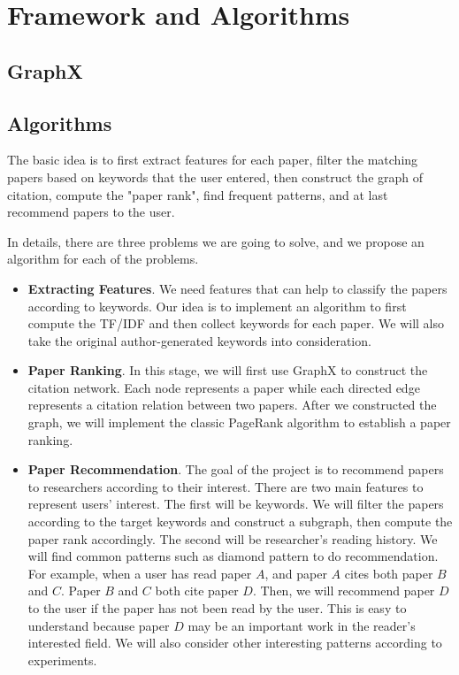 \section{Framework and Algorithms}

\subsection{GraphX}

\subsection{Algorithms}

The basic idea is to first extract features for each paper, filter the matching papers based on keywords that the user entered, then construct the graph of citation, compute the "paper rank", find frequent patterns, and at last recommend papers to the user.

In details, there are three problems we are going to solve, and we propose an algorithm for each of the problems.

\begin{itemize}
	\item \textbf{Extracting Features}. We need features that can help to classify the papers according to keywords. Our idea is to implement an algorithm to first compute the TF/IDF and then collect keywords for each paper. We will also take the original author-generated keywords into consideration.
	\item \textbf{Paper Ranking}. In this stage, we will first use GraphX to construct the citation network. Each node represents a paper while each directed edge represents a citation relation between two papers. After we constructed the graph, we will implement the classic PageRank algorithm to establish a paper ranking. 
	\item \textbf{Paper Recommendation}. The goal of the project is to recommend papers to researchers according to their interest. There are two main features to represent users' interest. The first will be keywords. We will filter the papers according to the target keywords and construct a subgraph, then compute the paper rank accordingly. The second will be researcher's reading history. We will find common patterns such as diamond pattern to do recommendation. For example, when a user has read paper $A$, and paper $A$ cites both paper $B$ and $C$. Paper $B$ and $C$ both cite paper $D$. Then, we will recommend paper $D$ to the user if the paper has not been read by the user. This is easy to understand because paper $D$ may be an important work in the reader's interested field. We will also consider other interesting patterns according to experiments.
\end{itemize}
